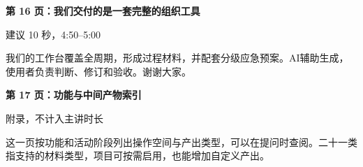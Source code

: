 \documentclass[UTF8,fontset=windows,zihao=-4,a4paper]{ctexart}
\begin{document}
{\large\bfseries\color{ink}第 16 页：我们交付的是一套完整的组织工具}\par
{\small\color{gray}建议 10 秒，4:50–5:00}\par
我们的工作台覆盖全周期，形成过程材料，并配套分级应急预案。AI辅助生成，使用者负责判断、修订和验收。谢谢大家。\par\vspace{8pt}

{\large\bfseries\color{ink}第 17 页：功能与中间产物索引}\par
{\small\color{gray}附录，不计入主讲时长}\par
这一页按功能和活动阶段列出操作空间与产出类型，可以在提问时查阅。二十一类指支持的材料类型，项目可按需启用，也能增加自定义产出。\par\vspace{8pt}
\end{document}
